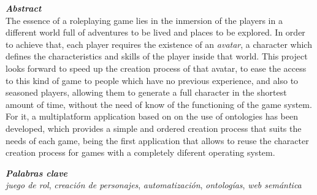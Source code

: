 {\large \textbf{\textit{Abstract}}} 
\vspace{0.5cm} \\
The essence of a roleplaying game lies in the inmersion of the players in a different world 
full of adventures to be lived and places to be explored. In order to achieve that, each player requires 
the existence of an \textit{avatar}, a character which defines the characteristics and skills of the player 
inside that world. This project looks forward to speed up the creation process of that avatar, to ease 
the access to this kind of game to people which have no previous experience, and also to seasoned players, 
allowing them to generate a full character in the shortest amount of time, without the need of know of 
the functioning of the game system. For it, a multiplatform application based on on the use of ontologies 
has been developed, which provides a simple and ordered creation process that suits the needs of each game, 
being the first application that allows to reuse the character creation process for games with a 
completely diferent operating system.
\vspace{2cm}

{\large \textbf{\textit{Palabras clave}}} 
\vspace{0.5cm} \\
\textit{juego de rol}, \textit{creación de personajes}, \textit{automatización},
\textit{ontologías}, \textit{web semántica}
\blankpage{}

%
%
%
%

